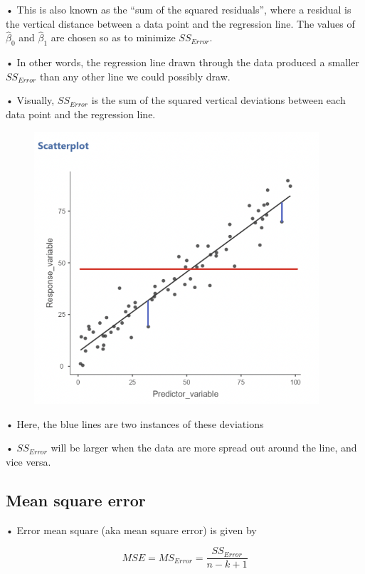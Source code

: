 \documentclass[
  letterpaper,
  DIV=11,
  numbers=noendperiod]{scrreprt}
\begin{document}
• This is also known as the ``sum of the squared residuals'', where a
residual is the vertical distance between a data point and the
regression line. The values of \(\hat{\beta}_0\) and \(\hat{\beta}_1\)
are chosen so as to minimize \(SS_{Error}\).

• In other words, the regression line drawn through the data produced a
smaller \(SS_{Error}\) than any other line we could possibly draw.

• Visually, \(SS_{Error}\) is the sum of the squared vertical deviations
between each data point and the regression line.

\begin{figure}

{\centering \includegraphics[width=4.16667in,height=\textheight]{images/Mod2_pt1_2.png}

}

\end{figure}

• Here, the blue lines are two instances of these deviations

• \(SS_{Error}\) will be larger when the data are more spread out around
the line, and vice versa.

\hypertarget{mean-square-error}{%
\subsection{Mean square error}\label{mean-square-error}}

• Error mean square (aka mean square error) is given by

\[
MSE = MS_{Error} = \frac{SS_{Error}}{n-k +1}
\]
\end{document}
